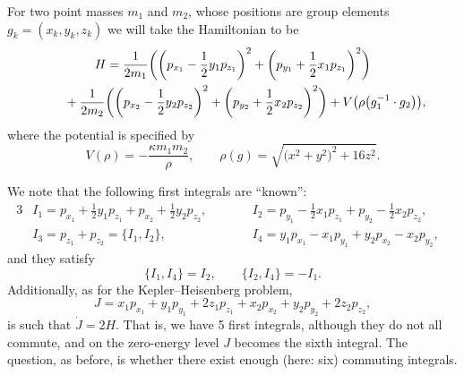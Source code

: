 \documentclass[11pt]{article}
\numberwithin{equation}{section}
\numberwithin{equation}{section}
\begin{document}
For two point masses $m_1$ and $m_2$, whose positions are group
elements $g_k = (x_k,y_k,z_k)$ we will take the Hamiltonian to be
\begin{gather}
 H = \frac{1}{2m_1}\bigg(\bigg(p_{x_1}-\frac12 y_1 p_{z_1}\bigg)^2
 + \bigg(p_{y_1}+\frac12 x_1 p_{z_1}\bigg)^2\bigg)\nonumber
 \\ \hphantom{H =}
 {}+ \frac{1}{2m_2}\bigg(\bigg(p_{x_2}-\frac12 y_2 p_{z_2}\bigg)^2 +
 \bigg(p_{y_2}+\frac12 x_2 p_{z_2}\bigg)^2\bigg) +
 V\big(\rho\big(g_1^{-1}\cdot g_2\big)\big),\label{eq:2b}
\end{gather}
where the potential is specified by
\begin{equation*}
 V(\rho) = -\frac{\kappa m_1 m_2}{\rho},\qquad
 \rho(g) = \sqrt{\big(x^2+y^2\big)^2+{16}z^2}.
\end{equation*}

We note that the following first integrals are ``known'':
\begin{alignat*}{3}
& I_1 = p_{x_1} +\frac12 y_1 p_{z_1} + p_{x_2} +\frac12 y_2 p_{z_2},
 \qquad&&
 I_2 = p_{y_1} -\frac12 x_1 p_{z_1} + p_{y_2} -\frac12 x_2 p_{z_2},&
 \\
 &I_3 = p_{z_1}+p_{z_2}=\{I_1,I_2\},
 \qquad&&
 I_4 = y_1 p_{x_1}-x_1 p_{y_1} + y_2 p_{x_2} - x_2 p_{y_2},&
\end{alignat*}
and they satisfy
\begin{equation*}
 \{I_1,I_4\}=I_2, \qquad
 \{I_2,I_4\} = -I_1.
\end{equation*}
Additionally, as for the Kepler--Heisenberg problem,
\begin{equation*}
 J = x_1 p_{x_1} + y_1 p_{y_1} + 2 z_1 p_{z_1} + x_2 p_{x_2} + y_2 p_{y_2} + 2 z_2 p_{z_2},
\end{equation*}
is such that $\dot{J}=2H$. That is, we have 5 first integrals,
although they do not all commute, and on the zero-energy level $J$
becomes the sixth integral. The question, as before, is whether there
exist enough (here: six) commuting integrals.
\end{document}
